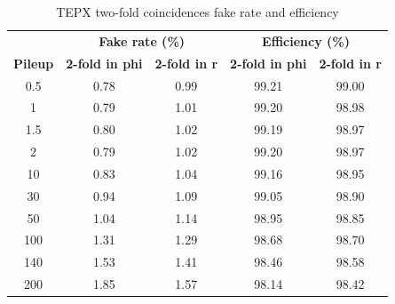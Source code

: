   
\begin{table}[H]
  \centering
  \caption{TEPX two-fold coincidences fake rate and efficiency}
  \begin{tabular}{ccccc}
    & \multicolumn{2}{c}{\textbf{Fake rate (\%)}} & \multicolumn{2}{c}{\textbf{Efficiency (\%)}} \\
    \textbf{Pileup}  & \textbf{2-fold in phi} & \textbf{2-fold in r} & \textbf{2-fold in phi} & \textbf{2-fold in r} \\
    \hline
    0.5  & 0.78 & 0.99 & 99.21 & 99.00 \\
    1    & 0.79 & 1.01 & 99.20 & 98.98 \\
    1.5  & 0.80 & 1.02 & 99.19 & 98.97 \\
    2    & 0.79 & 1.02 & 99.20 & 98.97 \\
    10   & 0.83 & 1.04 & 99.16 & 98.95 \\
    30   & 0.94 & 1.09 & 99.05 & 98.90 \\
    50   & 1.04 & 1.14 & 98.95 & 98.85 \\
    100  & 1.31 & 1.29 & 98.68 & 98.70 \\
    140  & 1.53 & 1.41 & 98.46 & 98.58 \\
    200  & 1.85 & 1.57 & 98.14 & 98.42 \\
  \end{tabular}
  \label{tab:combined_sample}
\end{table}





